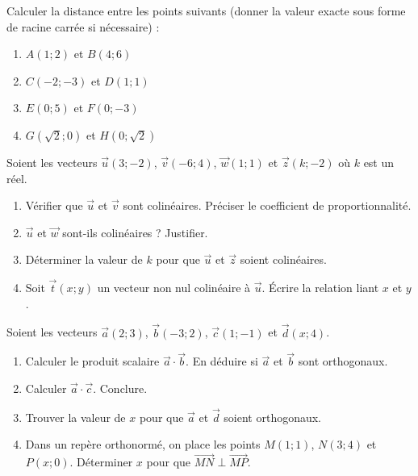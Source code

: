 \documentclass[11pt]{article}
\begin{document}
\begin{exercice}
Calculer la distance entre les points suivants (donner la valeur exacte sous forme de racine carrée si nécessaire) :
\begin{enumerate}
    \item $A(1;2)$ et $B(4;6)$
    \item $C(-2;-3)$ et $D(1;1)$
    \item $E(0;5)$ et $F(0;-3)$
    \item $G(\sqrt{2};0)$ et $H(0;\sqrt{2})$
\end{enumerate}
\end{exercice}

\begin{exercice}
Soient les vecteurs $\vec{u}(3;-2)$, $\vec{v}(-6;4)$, $\vec{w}(1;1)$ et $\vec{z}(k;-2)$ où $k$ est un réel.
\begin{enumerate}
    \item Vérifier que $\vec{u}$ et $\vec{v}$ sont colinéaires. Préciser le coefficient de proportionnalité.
    \item $\vec{u}$ et $\vec{w}$ sont-ils colinéaires ? Justifier.
    \item Déterminer la valeur de $k$ pour que $\vec{u}$ et $\vec{z}$ soient colinéaires.
    \item Soit $\vec{t}(x;y)$ un vecteur non nul colinéaire à $\vec{u}$. Écrire la relation liant $x$ et $y$.
\end{enumerate}
\end{exercice}

\begin{exercice}
Soient les vecteurs $\vec{a}(2;3)$, $\vec{b}(-3;2)$, $\vec{c}(1;-1)$ et $\vec{d}(x;4)$.
\begin{enumerate}
    \item Calculer le produit scalaire $\vec{a}\cdot\vec{b}$. En déduire si $\vec{a}$ et $\vec{b}$ sont orthogonaux.
    \item Calculer $\vec{a}\cdot\vec{c}$. Conclure.
    \item Trouver la valeur de $x$ pour que $\vec{a}$ et $\vec{d}$ soient orthogonaux.
    \item Dans un repère orthonormé, on place les points $M(1;1)$, $N(3;4)$ et $P(x;0)$. Déterminer $x$ pour que $\overrightarrow{MN} \perp \overrightarrow{MP}$.
\end{enumerate}
\end{exercice}
\end{document}
